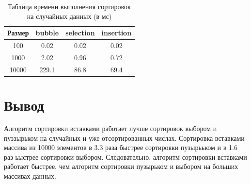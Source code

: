 \documentclass[12pt]{report}
\begin{document}
	\begin{table} [h!]
		\caption{Таблица времени выполнения сортировок на случайных данных (в мс)}
		\begin{center}
			\begin{tabular}{|c | c | c | c|}
				
				\hline
				
				Размер & bubble & selection & insertion  \\ [0.5ex]
				
				\hline
				
				100 & 0.02 & 0.02 & 0.02 \\ 
				
				\hline 
				
				1000 & 2.02 & 0.96 & 0.72 \\ 
				
				\hline 
				
				10000 & 229.1 & 86.8 & 69.4 \\ 
				
				\hline 
				
			\end{tabular}
		\end{center}
	\end{table}

	\begin{center}
	\end{center}

	\section{Вывод}
	
	Алгоритм сортировки вставками работает лучше сортировок выбором и пуззырьком на случайных и уже отсортированных числах. Сортировка вставками массива из 10000 элементов в 3.3 раза быстрее сортировки пузырььком и в 1.6 раз ьыстрее сортировки выбором. Следовательно, алгоритм сортировки вставками работает быстрее, чем алгоритм сортировки пузырьком и выбором на больших массивах данных.
	
\end{document}
